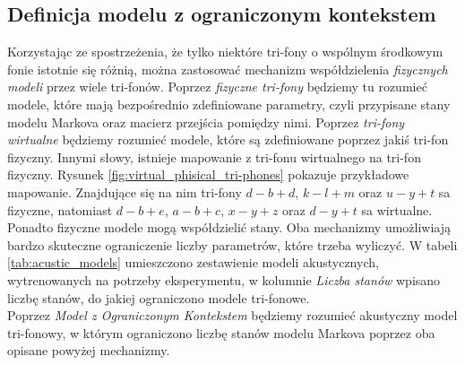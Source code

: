 \documentclass[11pt]{article}
\begin{document}
	\subsection{ Definicja modelu z ograniczonym kontekstem }
		\label{sec:tri-fone_mapping}
		Korzystając ze spostrzeżenia, że tylko niektóre tri-fony o wspólnym środkowym fonie istotnie się różnią, można zastosować mechanizm współdzielenia \textit{fizycznych modeli} przez wiele tri-fonów. Poprzez \textit{fizyczne tri-fony} będziemy tu rozumieć modele, które mają bezpośrednio zdefiniowane parametry, czyli przypisane stany modelu Markova oraz macierz przejścia pomiędzy nimi. Poprzez \textit{tri-fony wirtualne} będziemy rozumieć modele, które są zdefiniowane poprzez jakiś tri-fon fizyczny. Innymi słowy, istnieje mapowanie z tri-fonu wirtualnego na tri-fon fizyczny. Rysunek \ref{fig:virtual_phisical_tri-phones} pokazuje przykładowe mapowanie. Znajdujące się na nim tri-fony $d-b+d$, $k-l+m$ oraz $u-y+t$ sa fizyczne, natomiast $d-b+e$, $a-b+c$, $x-y+z$ oraz $d-y+t$ sa wirtualne. Ponadto fizyczne modele mogą współdzielić stany. Oba mechanizmy umożliwiają bardzo skuteczne ograniczenie liczby parametrów, które trzeba wyliczyć. W tabeli \ref{tab:acustic_models} umieszczono zestawienie modeli akustycznych, wytrenowanych na potrzeby eksperymentu, w kolumnie \textit{Liczba stanów} wpisano liczbę stanów, do jakiej ograniczono modele tri-fonowe. \\
		Poprzez \textit{Model z Ograniczonym Kontekstem} będziemy rozumieć akustyczny model tri-fonowy, w którym ograniczono liczbę stanów modelu Markova poprzez oba opisane powyżej mechanizmy.
		
\end{document}
